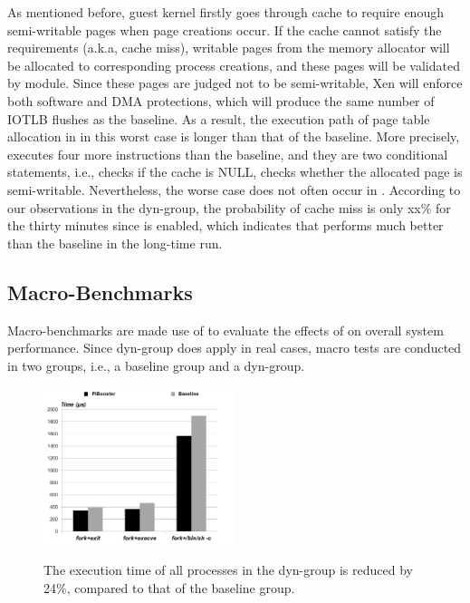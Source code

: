 
 As mentioned before, guest kernel firstly goes through \name cache to require enough semi-writable pages when page creations occur. If the cache cannot satisfy the requirements (a.k.a, cache miss), writable pages from the memory allocator will be allocated to corresponding process creations, and these pages will be validated by \name module. Since these pages are judged not to be semi-writable, Xen will enforce both software and DMA protections, which will produce the same number of IOTLB flushes as the baseline. As a result, the execution path of page table allocation in \name in this worst case is longer than that of the baseline. More precisely, \name executes four more instructions than the baseline, and they are two conditional statements, i.e., \name checks if the cache is NULL, \name checks whether the allocated page is semi-writable. Nevertheless, the worse case does not often occur in \name. According to our observations in the dyn-\name group, the probability of cache miss is only xx\% for the thirty minutes since \name is enabled, which indicates that \name performs much better than the baseline in the long-time run.


\subsection{Macro-Benchmarks}

Macro-benchmarks are made use of to evaluate the effects of \name on overall system performance. Since dyn-\name group does apply in real cases, macro tests are conducted in two groups, i.e., a baseline group and a dyn-\name group.

\begin{figure}[htp]
\centering
\includegraphics[width=0.5\textwidth]{image/macro/lmbench.png} \\
\caption{The execution time of all processes in the dyn-\name group is reduced by 24\%, compared to that of the baseline group.}
\label{fig:lmbench}
\end{figure}

